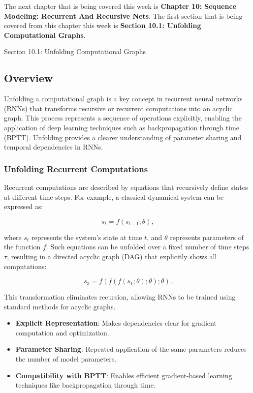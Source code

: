 The next chapter that is being covered this week is \textbf{Chapter 10: Sequence Modeling: Recurrent And Recursive Nets}. The first section that is being covered from this chapter this week is \textbf{Section 10.1: Unfolding Computational Graphs}.

\begin{notes}{Section 10.1: Unfolding Computational Graphs}
    \subsection*{Overview}

    Unfolding a computational graph is a key concept in recurrent neural networks (RNNs) that transforms recursive or recurrent computations into an acyclic graph. This process represents a sequence of 
    operations explicitly, enabling the application of deep learning techniques such as backpropagation through time (BPTT). Unfolding provides a clearer understanding of parameter sharing and temporal 
    dependencies in RNNs.
    
    \subsubsection*{Unfolding Recurrent Computations}
    
    Recurrent computations are described by equations that recursively define states at different time steps. For example, a classical dynamical system can be expressed as:
    
    \[
    s_t = f(s_{t-1}; \theta),
    \]
    
    where $s_t$ represents the system's state at time $t$, and $\theta$ represents parameters of the function $f$. Such equations can be unfolded over a fixed number of time steps $\tau$, 
    resulting in a directed acyclic graph (DAG) that explicitly shows all computations:
    
    \[
    s_3 = f(f(f(s_1; \theta); \theta); \theta).
    \]
    
    This transformation eliminates recursion, allowing RNNs to be trained using standard methods for acyclic graphs.
    
    \begin{highlight}
        \begin{itemize}
            \item \textbf{Explicit Representation}: Makes dependencies clear for gradient computation and optimization.
            \item \textbf{Parameter Sharing}: Repeated application of the same parameters reduces the number of model parameters.
            \item \textbf{Compatibility with BPTT}: Enables efficient gradient-based learning techniques like backpropagation through time.
        \end{itemize}
    \end{highlight}
    

\end{notes}
